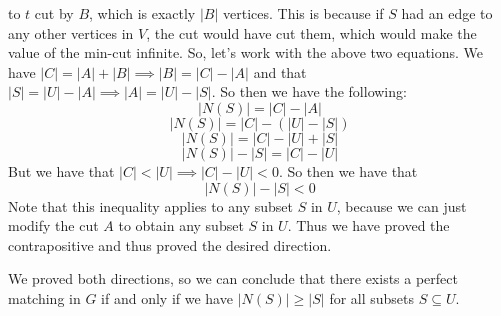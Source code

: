 \documentclass{article}
\begin{document}
\begin{description}
        to $t$ cut by $B$, which is exactly $|B|$ vertices. This is because if $S$
        had an edge to any other vertices in $V$, the cut would have cut them,
        which would make the value of the min-cut infinite. So, let's work with
        the above two equations. We have $|C| = |A| + |B| \implies |B| = |C| -
        |A|$ and that $|S| = |U| - |A| \implies |A| = |U| - |S|$. So then we have the following:
        \[ |N(S)| = |C| - |A| \]
        \[ |N(S)| = |C| - (|U| - |S|) \]
        \[ |N(S)| = |C| - |U| + |S| \]
        \[ |N(S)| - |S| = |C| - |U| \]
        But we have that $|C| < |U| \implies |C| - |U| < 0$. So then we have that
        \[ |N(S)| - |S| < 0 \]
        Note that this inequality applies to any subset $S$ in $U$, because we
        can just modify the cut $A$ to obtain any subset $S$ in $U$. Thus we
        have proved the contrapositive and thus proved the desired direction.

        We proved both directions, so we can conclude that there exists a
        perfect matching in $G$ if and only if we have $|N(S)| \ge |S|$ for all
        subsets $S \subseteq U$.
\end{description}
\newpage

\end{document}
